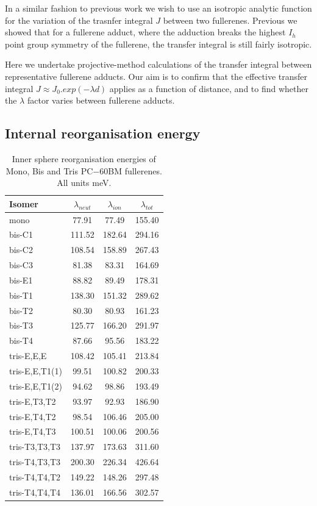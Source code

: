 \documentclass[journal=nanofd,manuscript=suppinfo]{achemso}
\begin{document}
In a similar fashion to previous work\cite{kwaitowski_fullerene} we wish to use an isotropic analytic function for the variation of the trasnfer integral $J$ between two fullerenes. 
Previous we showed that for a fullerene adduct, where the adduction breaks the highest $I_h$ point group symmetry of the fullerene, the transfer integral is still fairly isotropic.\cite{mackenzie_numerical_2010}

Here we undertake projective-method calculations of the transfer integral\cite{kirkpatrick_approximate_2008} between representative fullerene adducts. 
Our aim is to confirm that the effective transfer integral $J\approx J_0 . exp(-\lambda d)$ applies as a function of distance, and to find whether the $\lambda$ factor varies between fullerene adducts.


\subsection{Internal reorganisation energy}

\begin{table}
\centering
\begin{tabular}{lSSS}
\toprule
Isomer & $\lambda_{neut}$ & $\lambda_{ion}$ & $\lambda_{tot}$ \\
\midrule
mono & 77.91 & 77.49 & 155.40 \\
\midrule
bis-C1 & 111.52 & 182.64 & 294.16 \\
bis-C2 & 108.54 & 158.89 & 267.43 \\
bis-C3 & 81.38 & 83.31 & 164.69 \\
bis-E1 & 88.82 & 89.49 & 178.31 \\
bis-T1 & 138.30 & 151.32 & 289.62 \\
bis-T2 & 80.30 & 80.93 & 161.23 \\
bis-T3 & 125.77 & 166.20 & 291.97 \\
bis-T4 & 87.66 & 95.56 & 183.22 \\
\midrule
tris-E,E,E & 108.42 & 105.41 & 213.84 \\
tris-E,E,T1(1) & 99.51 & 100.82 & 200.33 \\
tris-E,E,T1(2) & 94.62 & 98.86 & 193.49 \\
tris-E,T3,T2 & 93.97 & 92.93 & 186.90 \\
tris-E,T4,T2 & 98.54 & 106.46 & 205.00 \\
tris-E,T4,T3 & 100.51 & 100.06 & 200.56 \\
tris-T3,T3,T3 & 137.97 & 173.63 & 311.60 \\
tris-T4,T3,T3 & 200.30 & 226.34 & 426.64 \\
tris-T4,T4,T2 & 149.22 & 148.26 & 297.48 \\
tris-T4,T4,T4 & 136.01 & 166.56 & 302.57 \\
\bottomrule
\end{tabular}
\caption{\label{tab:Lambda}
Inner sphere reorganisation energies of Mono, Bis and Tris PC$-{60}$BM fullerenes. All units meV.}
\end{table}
\end{document}
